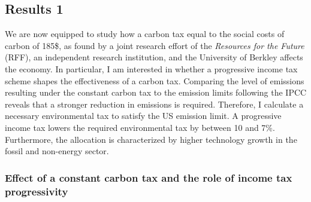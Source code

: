 \subsection{Results 1}\label{subsec:exp}


We are now equipped to study how a carbon tax  equal to the social costs of carbon of 185\$, as found by a joint research effort of the \textit{Resources for the Future} (RFF), an independent research institution, and the University of Berkley \citep{RFF} affects the economy. In particular, I am interested in whether a progressive income tax scheme shapes the effectiveness of a carbon tax. 
 Comparing the level of emissions resulting under the constant carbon tax to the emission limits following the IPCC reveals that a stronger reduction in emissions is required. Therefore, I calculate a necessary environmental tax to satisfy the US emission limit. A progressive income tax lowers the required environmental tax by between 10 and 7\%. Furthermore, the allocation is characterized by higher technology growth in the fossil and non-energy sector. 


\subsubsection{Effect of a constant carbon tax and the role of income tax progressivity}\label{subsec:eff_cc}

